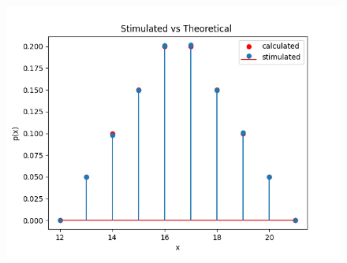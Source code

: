 \begin{figure}[h]
    \centering
    \includegraphics[width=\columnwidth]{solutions/cs/2015/3/figures/assignment4_plot1.png}
\end{figure}

